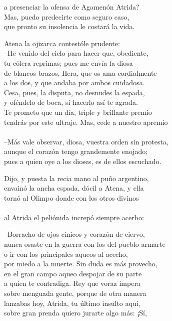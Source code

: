 a presenciar la ofensa de Agamenón Atrida?\\
Mas, puedo predecirte como seguro caso,\\
que pronto su insolencia le costará la vida.\par
Atena la ojizarca contestóle prudente:\\
--He venido del cielo para hacer que, obediente,\\
tu cólera reprimas; pues me envía la diosa\\
de blancos brazos, Hera, que os ama cordialmente\\
a los dos, y que andaba por ambos cuidadosa.\\
Cesa, pues, la disputa, no desnudes la espada,\\
y oféndelo de boca, si hacerlo así te agrada.\\
Te prometo que un día, triple y brillante premio\\
tendrás por este ultraje. Mas, cede a nuestro apremio\\
\\
--Más vale observar, diosa, vuestra orden sin protesta,\\
aunque el corazón tengo grandemente enojado;\\
pues a quien oye a los dioses, es de ellos escuchado.\par
Dijo, y puesta la recia mano al puño argentino,\\
envainó la ancha espada, dócil a Atena, y ella\\
tornó al Olimpo donde con los otros divinos\\
\\
al Atrida el peliónida increpó siempre acerbo:\par
--Borracho de ojos cínicos y corazón de ciervo,\\
nunca osaste en la guerra con los del pueblo armarte\\
o ir con los principales aqueos al acecho,\\
por miedo a la muerte. Sin duda es más provecho,\\
en el gran campo aqueo despojar de su parte\\
a quien te contradiga. Rey que voraz impera\\
sobre menguada gente, porque de otra manera\\
lanzabas hoy, Atrida, tu último insulto aquí,\\
sobre gran prenda quiero jurarte algo más: ¡Sí,\\
